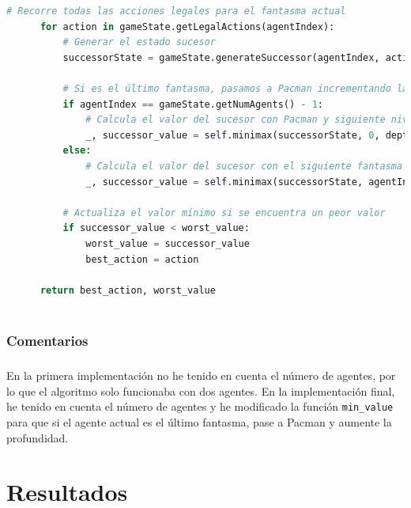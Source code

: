 \documentclass{report}
\begin{document}
\begin{lstlisting}[language=Python, caption=Implementación final del BFS]
      # Recorre todas las acciones legales para el fantasma actual
      for action in gameState.getLegalActions(agentIndex):
          # Generar el estado sucesor
          successorState = gameState.generateSuccessor(agentIndex, action)
          
          # Si es el último fantasma, pasamos a Pacman incrementando la profundidad
          if agentIndex == gameState.getNumAgents() - 1:
              # Calcula el valor del sucesor con Pacman y siguiente nivel de profundidad
              _, successor_value = self.minimax(successorState, 0, depth + 1)
          else:
              # Calcula el valor del sucesor con el siguiente fantasma
              _, successor_value = self.minimax(successorState, agentIndex + 1, depth)

          # Actualiza el valor mínimo si se encuentra un peor valor
          if successor_value < worst_value:
              worst_value = successor_value
              best_action = action

      return best_action, worst_value
        
          \end{lstlisting}
        \subsection{Comentarios}
          \paragraph*{}{
            En la primera implementación no he tenido en cuenta el número de agentes, por lo que el algoritmo solo funcionaba con dos agentes. En la implementación final, he tenido en cuenta el número de agentes y he modificado la función \texttt{min\_value} para que si el agente actual es el último fantasma, pase a Pacman y aumente la profundidad.
          }
    \chapter{Resultados}
\end{document}
